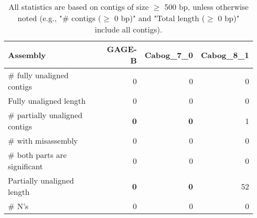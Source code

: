 \documentclass[12pt,a4paper]{article}
\begin{document}
\begin{table}[ht]
\begin{center}
\caption{All statistics are based on contigs of size $\geq$ 500 bp, unless otherwise noted (e.g., "\# contigs ($\geq$ 0 bp)" and "Total length ($\geq$ 0 bp)" include all contigs).}
\begin{tabular}{|l*{3}{|r}|}
\hline
Assembly & GAGE-B & Cabog\_7\_0 & Cabog\_8\_1 \\ \hline
\# fully unaligned contigs & 0 & 0 & 0 \\ \hline
Fully unaligned length & 0 & 0 & 0 \\ \hline
\# partially unaligned contigs & {\bf 0} & {\bf 0} & 1 \\ \hline
\hspace{5mm}\# with misassembly & 0 & 0 & 0 \\ \hline
\hspace{5mm}\# both parts are significant & 0 & 0 & 0 \\ \hline
Partially unaligned length & {\bf 0} & {\bf 0} & 52 \\ \hline
\# N's & 0 & 0 & 0 \\ \hline
\end{tabular}
\end{center}
\end{table}
\end{document}
